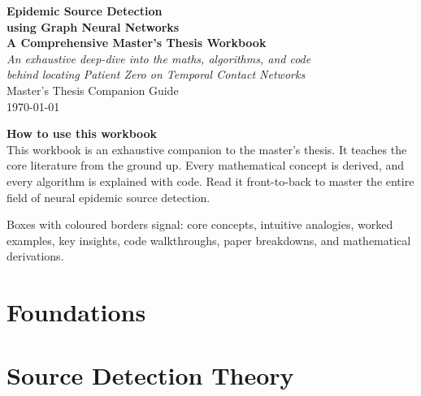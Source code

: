 \documentclass[11pt,a4paper,oneside]{report}
\begin{document}
\begin{titlepage}
  \centering
  \vspace*{1.5cm}
  {\Huge\bfseries\sffamily Epidemic Source Detection\\using Graph Neural Networks\\[0.4em]
   \Large A Comprehensive Master's Thesis Workbook}\\[1.5em]
  {\large\itshape An exhaustive deep-dive into the maths, algorithms, and code\\
  behind locating Patient Zero on Temporal Contact Networks}\\[3em]
  {\large Master's Thesis Companion Guide}\\[0.5em]
  {\large\today}\\[4em]
  \begin{mdframed}[backgroundcolor=blue!6,linecolor=blue!40,linewidth=1.5pt,roundcorner=5pt,innerleftmargin=15pt,innerrightmargin=15pt,innertopmargin=15pt,innerbottommargin=15pt]
  \centering
  \textbf{How to use this workbook}\\[0.5em]
  \small
  This workbook is an exhaustive companion to the master's thesis. It teaches the core literature from the ground up. Every mathematical concept is derived, and every algorithm is explained with code. Read it front-to-back to master the entire field of neural epidemic source detection.

  Boxes with coloured borders signal: {\color{blue!60!black}core concepts}, {\color{green!50!black}intuitive analogies},
  {\color{orange!70!black}worked examples}, {\color{purple!60!black}key insights},
  {\color{gray!60}code walkthroughs}, {\color{red!55!black}paper breakdowns}, and {\color{yellow!60!black}mathematical derivations}.
  \end{mdframed}
\end{titlepage}

\tableofcontents
\clearpage

\part{Foundations}




\part{Source Detection Theory}


\end{document}
